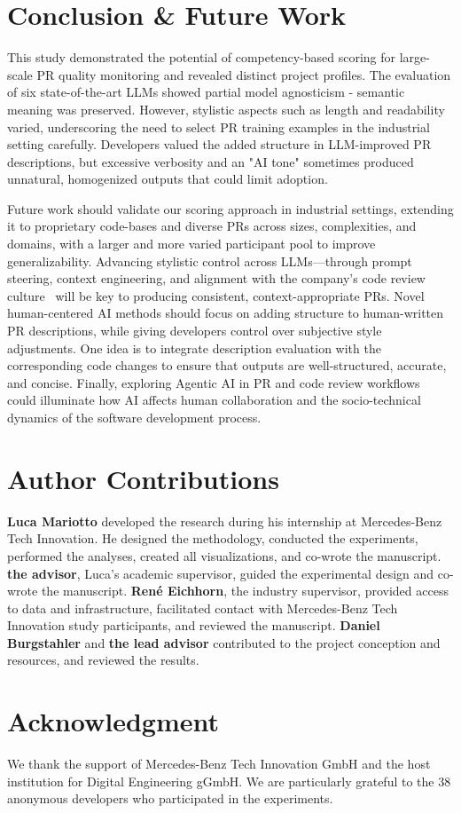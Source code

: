 \documentclass[conference]{IEEEtran}
\begin{document}
\section{Conclusion \& Future Work}\label{sec:conclusion}
This study demonstrated the potential of competency-based scoring for large-scale PR quality monitoring and revealed distinct project profiles. The evaluation of six state-of-the-art LLMs showed partial model agnosticism - semantic meaning was preserved. However, stylistic aspects such as length and readability varied, underscoring the need to select PR training examples in the industrial setting carefully. Developers valued the added structure in LLM-improved PR descriptions, but excessive verbosity and an "AI tone" sometimes produced unnatural, homogenized outputs that could limit adoption.

 Future work should validate our scoring approach in industrial settings, extending it to proprietary code-bases and diverse PRs across sizes, complexities, and domains, with a larger and more varied participant pool to improve generalizability. Advancing stylistic control across LLMs—through prompt steering, context engineering, and alignment with the company's code review culture~\cite{roychoudhury2025agentic} will be key to producing consistent, context-appropriate PRs. Novel human-centered AI methods should focus on adding structure to human-written PR descriptions,  while giving developers control over subjective style adjustments. One idea is to integrate description evaluation with the corresponding code changes to ensure that outputs are well-structured, accurate, and concise. Finally, exploring Agentic AI in PR and code review workflows~\cite{li2025rise} could illuminate how AI affects human collaboration and the socio-technical dynamics of the software development process.

\section*{Author Contributions}
\textbf{Luca Mariotto} developed the research during his internship at Mercedes-Benz Tech Innovation. He designed the methodology, conducted the experiments, performed the analyses, created all visualizations, and co-wrote the manuscript. \textbf{the advisor}, Luca's academic supervisor, guided the experimental design and co-wrote the manuscript. \textbf{René Eichhorn}, the industry supervisor, provided access to data and infrastructure, facilitated contact with Mercedes-Benz Tech Innovation study participants, and reviewed the manuscript. \textbf{Daniel Burgstahler} and \textbf{the lead advisor} contributed to the project conception and resources, and reviewed the results.

\section*{Acknowledgment}
We thank the support of Mercedes-Benz Tech Innovation GmbH and the host institution for Digital Engineering gGmbH. We are particularly grateful to the 38 anonymous developers who participated in the experiments.


\end{document}
